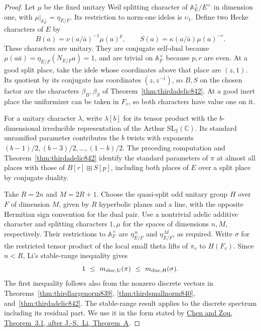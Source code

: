 \documentclass[a4paper,11pt]{article}
\theoremstyle{definition}
\theoremstyle{remark}
\numberwithin{equation}{section}
\begin{document}
\begin{proof}
Let \(\mu\) be the fixed unitary Weil splitting character of
\(\mathbb A_E^\times/E^\times\) in dimension one, with
\(\mu|_{\mathbb A_F^\times}=\eta_{E/F}\). Its restriction to
norm-one ideles is \(\upsilon_1\). Define two Hecke characters of \(E\) by
\[
 B(a)=\nu(a/\bar a)^{-1}\mu(a)^p,\qquad
 S(a)=\kappa(a/\bar a)\mu(a)^{-r}.
\]
These characters are unitary. They are conjugate self-dual because
\(\mu(a\bar a)=\eta_{E/F}(N_{E/F}a)=1\), and are trivial on
\(\mathbb A_F^\times\) because \(p,r\) are even. At a good split
place, take the idele whose coordinates above that place are
\((z,1)\). Its quotient by its conjugate has coordinates
\((z,z^{-1})\), so \(B,S\) on the chosen factor are the characters
\(\beta_B,\beta_S\) of Theorem~\ref{thm:thirdadelic842}. At a
good inert place the uniformizer can be taken in \(F_v\), so both
characters have value one on it.

For a unitary character \(\lambda\), write \(\lambda[b]\) for its
tensor product with the \(b\)-dimensional irreducible representation
of the Arthur \(\mathrm{SL}_2(\mathbb C)\). Its standard unramified
parameter contributes the \(b\) twists with exponents
\((b-1)/2,(b-3)/2,\ldots,(1-b)/2\). The preceding computation and
Theorem~\ref{thm:thirdadelic842} identify the standard parameters
of \(\pi\) at almost all places with those of
\(B[r]\boxplus S[p]\), including both places of \(E\) over a split
place by conjugate duality.

Take \(R=2n\) and \(M=2R+1\). Choose the quasi-split odd unitary
group \(H\) over \(F\) of dimension \(M\), given by \(R\) hyperbolic
planes and a line, with the opposite Hermitian sign convention for
the dual pair. Use a nontrivial adelic additive character and
splitting characters \(1,\mu\) for the spaces of dimensions \(n,M\),
respectively. Their restrictions to \(\mathbb A_F^\times\) are
\(\eta_{E/F}^{\,n}\) and \(\eta_{E/F}^{\,M}\), as required.
Write \(\sigma\) for the restricted tensor product of the local
small theta lifts of \(\pi_v\) to \(H(F_v)\). Since \(n<R\),
Li's stable-range inequality gives
\[
 1\ \le\ m_{\rm disc,U}(\pi)\ \le\ m_{\rm disc,H}(\sigma).
\]
The first inequality follows also from the nonzero discrete
vectors in Theorems~\ref{thm:thirdlargenorm839},
\ref{thm:thirdsmallnorm840}, and~\ref{thm:thirdadelic842}.
The stable-range result applies to the discrete spectrum including
its residual part. We use it in the form stated by
\href{https://arxiv.org/pdf/2103.07956}
{Chen and Zou, Theorem~3.1, after J.-S.~Li, Theorem~A}.


\end{proof}
\end{document}
